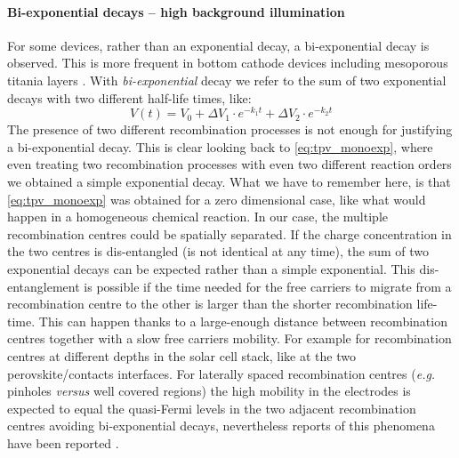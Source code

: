 	\paragraph{Bi-exponential decays -- high background illumination}
	For some devices, rather than an exponential decay, a bi-exponential decay is observed.
	This is more frequent in bottom cathode devices including mesoporous titania layers \cite{Carnie2015,ORegan2015b}.
	With \emph{bi-exponential} decay we refer to the sum of two exponential decays with two different half-life times, like:
	\begin{equation}\label{eq:tpv_biexp}
		V (t) = V_0 + \Delta V_1 \cdot e^{-k_1t} + \Delta V_2 \cdot e^{-k_2t}
	\end{equation}
	The presence of two different recombination processes is not enough for justifying a bi-exponential decay.
	This is clear looking back to \cref{eq:tpv_monoexp}, where even treating two recombination processes with even two different reaction orders we obtained a simple exponential decay.
	What we have to remember here, is that \cref{eq:tpv_monoexp} was obtained for a zero dimensional case, like what would happen in a homogeneous chemical reaction.
	In our case, the multiple recombination centres could be spatially separated.
	If the charge concentration in the two centres is dis-entangled (is not identical at any time), the sum of two exponential decays can be expected rather than a simple exponential.
	This dis-entanglement is possible if the time needed for the free carriers to migrate from a recombination centre to the other is larger than the shorter recombination life-time.
	This can happen thanks to a large-enough distance between recombination centres together with a slow free carriers mobility.
	For example for recombination centres at different depths in the solar cell stack, like at the two perovskite/contacts interfaces.
	For laterally spaced recombination centres (\textit{e.g.} pinholes \textit{versus} well covered regions) the high mobility in the electrodes is expected to equal the quasi-Fermi levels in the two adjacent recombination centres avoiding bi-exponential decays, nevertheless reports of this phenomena have been reported \cite{Montcada2017}.

